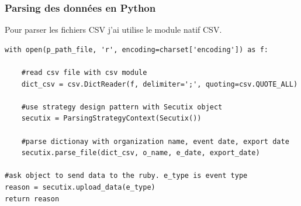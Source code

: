 \subsubsection{Parsing des données en Python}
Pour parser les fichiers CSV j'ai utilise le module natif CSV. 


\lstset{style=custompython}
\begin{lstlisting}
with open(p_path_file, 'r', encoding=charset['encoding']) as f:

	#read csv file with csv module
	dict_csv = csv.DictReader(f, delimiter=';', quoting=csv.QUOTE_ALL)
	
	#use strategy design pattern with Secutix object
	secutix = ParsingStrategyContext(Secutix())	
	
	#parse dictionay with organization name, event date, export date
	secutix.parse_file(dict_csv, o_name, e_date, export_date)

#ask object to send data to the ruby. e_type is event type 
reason = secutix.upload_data(e_type)
return reason
\end{lstlisting}


















